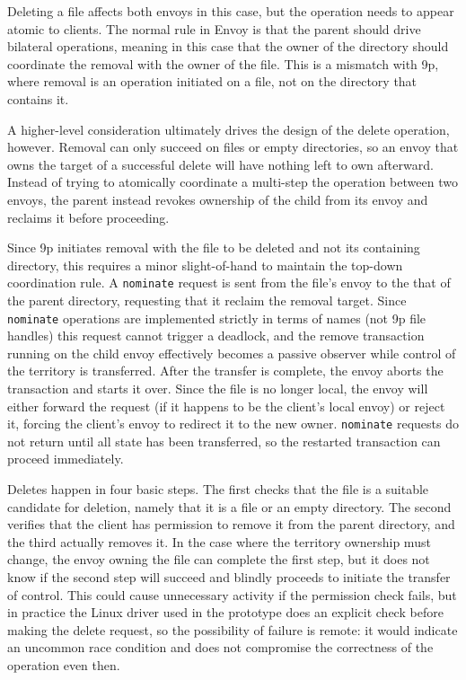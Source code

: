 Deleting a file affects both envoys in this case, but the operation needs to appear atomic to clients. The normal rule in Envoy is that the parent should drive bilateral operations, meaning in this case that the owner of the directory should coordinate the removal with the owner of the file. This is a mismatch with 9p, where removal is an operation initiated on a file, not on the directory that contains it.

A higher-level consideration ultimately drives the design of the delete operation, however. Removal can only succeed on files or empty directories, so an envoy that owns the target of a successful delete will have nothing left to own afterward. Instead of trying to atomically coordinate a multi-step the operation between two envoys, the parent instead revokes ownership of the child from its envoy and reclaims it before proceeding.

Since 9p initiates removal with the file to be deleted and not its containing directory, this requires a minor slight-of-hand to maintain the top-down coordination rule. A \texttt{nominate} request is sent from the file's envoy to the that of the parent directory, requesting that it reclaim the removal target. Since \texttt{nominate} operations are implemented strictly in terms of names (not 9p file handles) this request cannot trigger a deadlock, and the remove transaction running on the child envoy effectively becomes a passive observer while control of the territory is transferred. After the transfer is complete, the envoy aborts the transaction and starts it over. Since the file is no longer local, the envoy will either forward the request (if it happens to be the client's local envoy) or reject it, forcing the client's envoy to redirect it to the new owner. \texttt{nominate} requests do not return until all state has been transferred, so the restarted transaction can proceed immediately.

Deletes happen in four basic steps. The first checks that the file is a suitable candidate for deletion, namely that it is a file or an empty directory. The second verifies that the client has permission to remove it from the parent directory, and the third actually removes it. In the case where the territory ownership must change, the envoy owning the file can complete the first step, but it does not know if the second step will succeed and blindly proceeds to initiate the transfer of control. This could cause unnecessary activity if the permission check fails, but in practice the Linux driver used in the prototype does an explicit check before making the delete request, so the possibility of failure is remote: it would indicate an uncommon race condition and does not compromise the correctness of the operation even then.

